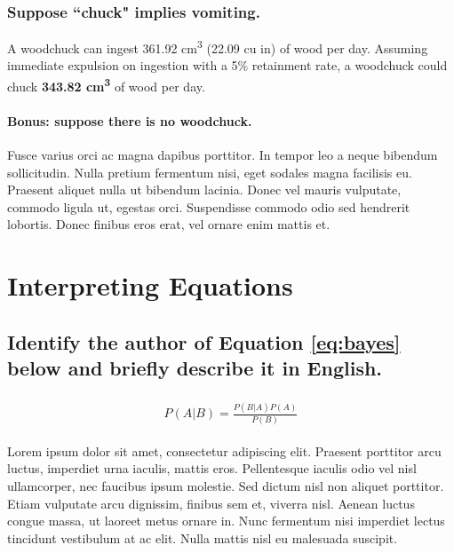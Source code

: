 \documentclass[11pt]{scrartcl} %
\begin{document}

\subsubsection{Suppose ``chuck" implies vomiting.}

A woodchuck can ingest 361.92 cm\textsuperscript{3} (22.09 cu in) of wood per day. Assuming immediate expulsion on ingestion with a 5\% retainment rate, a woodchuck could chuck \textbf{343.82 cm\textsuperscript{3}} of wood per day.


\paragraph{Bonus: suppose there is no woodchuck.}

Fusce varius orci ac magna dapibus porttitor. In tempor leo a neque bibendum sollicitudin. Nulla pretium fermentum nisi, eget sodales magna facilisis eu. Praesent aliquet nulla ut bibendum lacinia. Donec vel mauris vulputate, commodo ligula ut, egestas orci. Suspendisse commodo odio sed hendrerit lobortis. Donec finibus eros erat, vel ornare enim mattis et.


\section{Interpreting Equations}

\subsection{Identify the author of Equation \ref{eq:bayes} below and briefly describe it in English.}

\begin{align} 
	\label{eq:bayes}
	\begin{split}
		P(A|B) = \frac{P(B|A)P(A)}{P(B)}
	\end{split}					
\end{align}

Lorem ipsum dolor sit amet, consectetur adipiscing elit. Praesent porttitor arcu luctus, imperdiet urna iaculis, mattis eros. Pellentesque iaculis odio vel nisl ullamcorper, nec faucibus ipsum molestie. Sed dictum nisl non aliquet porttitor. Etiam vulputate arcu dignissim, finibus sem et, viverra nisl. Aenean luctus congue massa, ut laoreet metus ornare in. Nunc fermentum nisi imperdiet lectus tincidunt vestibulum at ac elit. Nulla mattis nisl eu malesuada suscipit.
\end{document}
